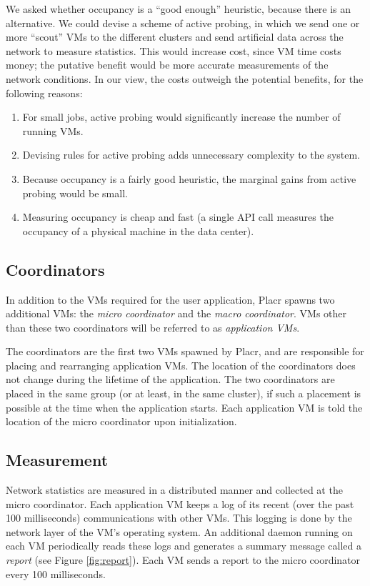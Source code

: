 \documentclass[11pt]{article}
\begin{document}
We asked whether occupancy is a ``good enough'' heuristic, because there is an alternative.  We could devise a scheme of active probing, in which we send one or more ``scout'' VMs to the different clusters and send artificial data across the network to measure statistics.  This would increase cost, since VM time costs money; the putative benefit would be more accurate measurements of the network conditions.  In our view, the costs outweigh the potential benefits, for the following reasons:

\begin{enumerate}[noitemsep]
  \item For small jobs, active probing would significantly increase the number of running VMs.
  \item Devising rules for active probing adds unnecessary complexity to the system.
  \item Because occupancy is a fairly good heuristic, the marginal gains from active probing would be small.
  \item Measuring occupancy is cheap and fast (a single API call measures the occupancy of a physical machine in the data center).
\end{enumerate}

\subsection{Coordinators}

In addition to the VMs required for the user application, Placr spawns two additional VMs: the \textit{micro coordinator} and the \textit{macro coordinator}.  VMs other than these two coordinators will be referred to as \textit{application VMs}.

The coordinators are the first two VMs spawned by Placr, and are responsible for placing and rearranging application VMs.  The location of the coordinators does not change during the lifetime of the application.  The two coordinators are placed in the same group (or at least, in the same cluster), if such a placement is possible at the time when the application starts.  Each application VM is told the location of the micro coordinator upon initialization.

\subsection{Measurement}

Network statistics are measured in a distributed manner and collected at the micro coordinator.  Each application VM keeps a log of its recent (over the past 100 milliseconds) communications with other VMs.  This logging is done by the network layer of the VM's operating system.  An additional daemon running on each VM periodically reads these logs and generates a summary message called a \textit{report} (see Figure \ref{fig:report}).  Each VM sends a report to the micro coordinator every 100 milliseconds.
\end{document}
